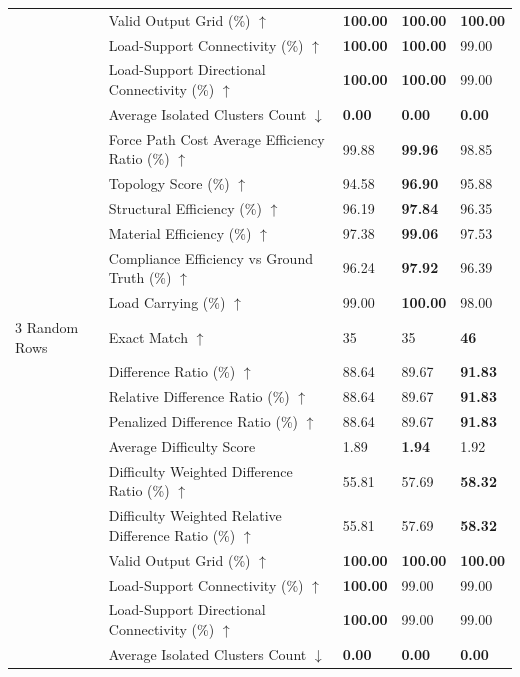 \begin{table}[!h]
{\begin{tabular}{lllll}
 & Valid Output Grid (\%) $\uparrow$ & \textbf{100.00} & \textbf{100.00} & \textbf{100.00} \\
 & Load-Support Connectivity (\%) $\uparrow$ & \textbf{100.00} & \textbf{100.00} & 99.00 \\
 & Load-Support Directional Connectivity (\%) $\uparrow$ & \textbf{100.00} & \textbf{100.00} & 99.00 \\
 & Average Isolated Clusters Count $\downarrow$ & \textbf{0.00} & \textbf{0.00} & \textbf{0.00} \\
 & Force Path Cost Average Efficiency Ratio (\%) $\uparrow$ & 99.88 & \textbf{99.96} & 98.85 \\
 & Topology Score (\%) $\uparrow$ & 94.58 & \textbf{96.90} & 95.88 \\
 & Structural Efficiency (\%) $\uparrow$ & 96.19 & \textbf{97.84} & 96.35 \\
 & Material Efficiency (\%) $\uparrow$ & 97.38 & \textbf{99.06} & 97.53 \\
 & Compliance Efficiency vs Ground Truth (\%) $\uparrow$ & 96.24 & \textbf{97.92} & 96.39 \\
 & Load Carrying (\%) $\uparrow$ & 99.00 & \textbf{100.00} & 98.00 \\
3 Random Rows & Exact Match $\uparrow$ & 35 & 35 & \textbf{46} \\
 & Difference Ratio (\%) $\uparrow$ & 88.64 & 89.67 & \textbf{91.83} \\
 & Relative Difference Ratio (\%) $\uparrow$ & 88.64 & 89.67 & \textbf{91.83} \\
 & Penalized Difference Ratio (\%) $\uparrow$ & 88.64 & 89.67 & \textbf{91.83} \\
 & Average Difficulty Score & 1.89 & \textbf{1.94} & 1.92 \\
 & Difficulty Weighted Difference Ratio (\%) $\uparrow$ & 55.81 & 57.69 & \textbf{58.32} \\
 & Difficulty Weighted Relative Difference Ratio (\%) $\uparrow$ & 55.81 & 57.69 & \textbf{58.32} \\
 & Valid Output Grid (\%) $\uparrow$ & \textbf{100.00} & \textbf{100.00} & \textbf{100.00} \\
 & Load-Support Connectivity (\%) $\uparrow$ & \textbf{100.00} & 99.00 & 99.00 \\
 & Load-Support Directional Connectivity (\%) $\uparrow$ & \textbf{100.00} & 99.00 & 99.00 \\
 & Average Isolated Clusters Count $\downarrow$ & \textbf{0.00} & \textbf{0.00} & \textbf{0.00} \\

\end{tabular}}
\end{table}
